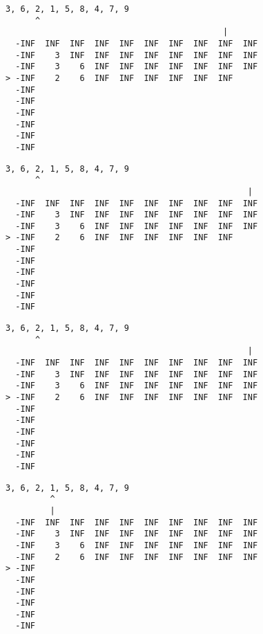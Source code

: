 { \begin{verbatim}
3, 6, 2, 1, 5, 8, 4, 7, 9
      ^
                                            |
  -INF  INF  INF  INF  INF  INF  INF  INF  INF  INF
  -INF    3  INF  INF  INF  INF  INF  INF  INF  INF
  -INF    3    6  INF  INF  INF  INF  INF  INF  INF
> -INF    2    6  INF  INF  INF  INF  INF  INF     
  -INF                                             
  -INF                                             
  -INF                                             
  -INF                                             
  -INF                                             
  -INF                                             
\end{verbatim} }

{ \begin{verbatim}
3, 6, 2, 1, 5, 8, 4, 7, 9
      ^
                                                 |
  -INF  INF  INF  INF  INF  INF  INF  INF  INF  INF
  -INF    3  INF  INF  INF  INF  INF  INF  INF  INF
  -INF    3    6  INF  INF  INF  INF  INF  INF  INF
> -INF    2    6  INF  INF  INF  INF  INF  INF     
  -INF                                             
  -INF                                             
  -INF                                             
  -INF                                             
  -INF                                             
  -INF                                             
\end{verbatim} }

{ \begin{verbatim}
3, 6, 2, 1, 5, 8, 4, 7, 9
      ^
                                                 |
  -INF  INF  INF  INF  INF  INF  INF  INF  INF  INF
  -INF    3  INF  INF  INF  INF  INF  INF  INF  INF
  -INF    3    6  INF  INF  INF  INF  INF  INF  INF
> -INF    2    6  INF  INF  INF  INF  INF  INF  INF
  -INF                                             
  -INF                                             
  -INF                                             
  -INF                                             
  -INF                                             
  -INF                                             
\end{verbatim} }

{ \begin{verbatim}
3, 6, 2, 1, 5, 8, 4, 7, 9
         ^
         |
  -INF  INF  INF  INF  INF  INF  INF  INF  INF  INF
  -INF    3  INF  INF  INF  INF  INF  INF  INF  INF
  -INF    3    6  INF  INF  INF  INF  INF  INF  INF
  -INF    2    6  INF  INF  INF  INF  INF  INF  INF
> -INF                                             
  -INF                                             
  -INF                                             
  -INF                                             
  -INF                                             
  -INF                                             
\end{verbatim} }

